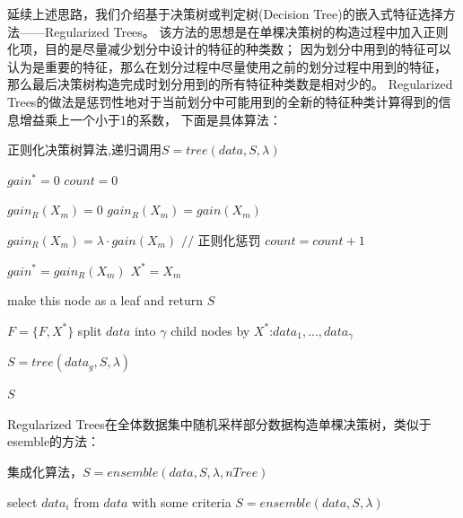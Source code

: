 \documentclass[a4paper,UTF8]{article}
\begin{document}
延续上述思路，我们介绍基于决策树或判定树(Decision Tree)的嵌入式特征选择方法——Regularized Trees。
该方法的思想是在单棵决策树的构造过程中加入正则化项，目的是尽量减少划分中设计的特征的种类数；
因为划分中用到的特征可以认为是重要的特征，那么在划分过程中尽量使用之前的划分过程中用到的特征，
那么最后决策树构造完成时划分用到的所有特征种类数是相对少的。
Regularized Trees的做法是惩罚性地对于当前划分中可能用到的全新的特征种类计算得到的信息增益乘上一个小于1的系数，
下面是具体算法：

\begin{algorithm}
  \caption{正则化决策树算法,递归调用$S=tree(data,S,\lambda)$}
  \begin{algorithmic}[1]

    \STATE $gain^{*}=0$
    \STATE $count=0$

      \STATE $gain_{R}(X_{m})=0$
        \STATE $gain_{R}(X_{m})=gain(X_{m})$
      \ENDIF

        \STATE $gain_{R}(X_{m})=\lambda \cdot gain(X_{m})$ $//$ 正则化惩罚
        \STATE $count=count+1$
      \ENDIF

        \STATE $gain^{*}=gain_{R}(X_{m})$
        \STATE $X^{*}=X_{m}$
      \ENDIF

    \ENDFOR

      \STATE make this node as a leaf and return $S$
    \ENDIF

      \STATE $F=\{F,X^{*}\}$
    \ENDIF
    \STATE split $data$ into $\gamma$ child nodes by $X^{*}$:$data_{1},...,data_{\gamma}$

      \STATE $S=tree(data_{g},S,\lambda)$
    \ENDFOR

    \RETURN $S$
  \end{algorithmic}

\end{algorithm}


Regularized Trees在全体数据集中随机采样部分数据构造单棵决策树，类似于esemble的方法：
\begin{algorithm}
  \caption{集成化算法，$S=ensemble(data,S,\lambda,nTree)$}
  \begin{algorithmic}[1]

      \STATE select $data_{i}$ from $data$ with some criteria
      \STATE $S=ensemble(data,S,\lambda)$
    \ENDFOR
  \end{algorithmic}


\end{algorithm}
\end{document}
